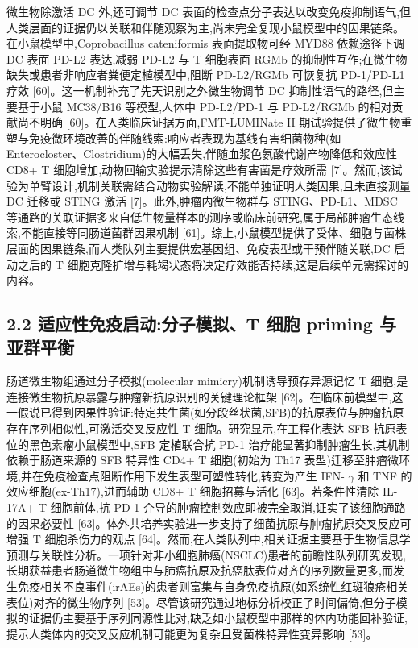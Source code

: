 \documentclass[11pt]{article}
\begin{document}
微生物除激活 DC 外,还可调节 DC 表面的检查点分子表达以改变免疫抑制语气,但人类层面的证据仍以关联和伴随观察为主,尚未完全复现小鼠模型中的因果链条。在小鼠模型中,Coprobacillus cateniformis 表面提取物可经 MYD88 依赖途径下调 DC 表面 PD-L2 表达,减弱 PD-L2 与 T 细胞表面 RGMb 的抑制性互作;在微生物缺失或患者非响应者粪便定植模型中,阻断 PD-L2/RGMb 可恢复抗 PD-1/PD-L1 疗效 {[}60{]}。这一机制补充了先天识别之外微生物调节 DC 抑制性语气的路径,但主要基于小鼠 MC38/B16 等模型,人体中 PD-L2/PD-1 与 PD-L2/RGMb 的相对贡献尚不明确 {[}60{]}。在人类临床证据方面,FMT-LUMINate II 期试验提供了微生物重塑与免疫微环境改善的伴随线索:响应者表现为基线有害细菌物种(如 Enterocloster、Clostridium)的大幅丢失,伴随血浆色氨酸代谢产物降低和效应性 CD8+ T 细胞增加,动物回输实验提示清除这些有害菌是疗效所需 {[}7{]}。然而,该试验为单臂设计,机制关联需结合动物实验解读,不能单独证明人类因果,且未直接测量 DC 迁移或 STING 激活 {[}7{]}。此外,肿瘤内微生物群与 STING、PD-L1、MDSC 等通路的关联证据多来自低生物量样本的测序或临床前研究,属于局部肿瘤生态线索,不能直接等同肠道菌群因果机制 {[}61{]}。综上,小鼠模型提供了受体、细胞与菌株层面的因果链条,而人类队列主要提供宏基因组、免疫表型或干预伴随关联,DC 启动之后的 T 细胞克隆扩增与耗竭状态将决定疗效能否持续,这是后续单元需探讨的内容。

\subsection{2.2 适应性免疫启动:分子模拟、T 细胞 priming 与亚群平衡}\label{ux9002ux5e94ux6027ux514dux75abux542fux52a8ux5206ux5b50ux6a21ux62dft-ux7ec6ux80de-priming-ux4e0eux4e9aux7fa4ux5e73ux8861}

肠道微生物组通过分子模拟(molecular mimicry)机制诱导预存异源记忆 T 细胞,是连接微生物抗原暴露与肿瘤新抗原识别的关键理论框架 {[}62{]}。在临床前模型中,这一假说已得到因果性验证:特定共生菌(如分段丝状菌,SFB)的抗原表位与肿瘤抗原存在序列相似性,可激活交叉反应性 T 细胞。研究显示,在工程化表达 SFB 抗原表位的黑色素瘤小鼠模型中,SFB 定植联合抗 PD-1 治疗能显著抑制肿瘤生长,其机制依赖于肠道来源的 SFB 特异性 CD4+ T 细胞(初始为 Th17 表型)迁移至肿瘤微环境,并在免疫检查点阻断作用下发生表型可塑性转化,转变为产生 IFN- \(\gamma\) 和 TNF 的效应细胞(ex-Th17),进而辅助 CD8+ T 细胞招募与活化 {[}63{]}。若条件性清除 IL-17A+ T 细胞前体,抗 PD-1 介导的肿瘤控制效应即被完全取消,证实了该细胞通路的因果必要性 {[}63{]}。体外共培养实验进一步支持了细菌抗原与肿瘤抗原交叉反应可增强 T 细胞杀伤力的观点 {[}64{]}。然而,在人类队列中,相关证据主要基于生物信息学预测与关联性分析。一项针对非小细胞肺癌(NSCLC)患者的前瞻性队列研究发现,长期获益患者肠道微生物组中与肺癌抗原及抗癌肽表位对齐的序列数量更多,而发生免疫相关不良事件(irAEs)的患者则富集与自身免疫抗原(如系统性红斑狼疮相关表位)对齐的微生物序列 {[}53{]}。尽管该研究通过地标分析校正了时间偏倚,但分子模拟的证据仍主要基于序列同源性比对,缺乏如小鼠模型中那样的体内功能回补验证,提示人类体内的交叉反应机制可能更为复杂且受菌株特异性变异影响 {[}53{]}。
\end{document}
